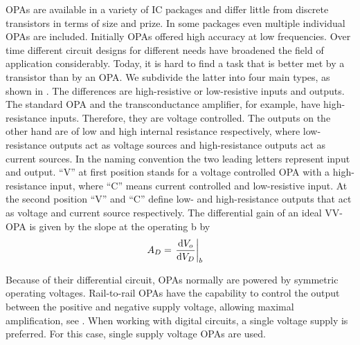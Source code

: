 \ac{OPA}s are available in a variety of \ac{IC} packages and differ little from discrete transistors in terms of size and prize. In some packages even multiple individual \ac{OPA}s are included. Initially \ac{OPA}s offered high accuracy at low frequencies. Over time different circuit designs for different needs have broadened the field of application considerably. Today, it is hard to find a task that is better met by a transistor than by an \ac{OPA}. We subdivide the latter into four main types, as shown in . The differences are high-resistive or low-resistive inputs and outputs. The standard \ac{OPA} and the transconductance amplifier, for example, have high-resistance inputs. Therefore, they are voltage controlled. The outputs on the other hand are of low and high internal resistance respectively, where low-resistance outputs act as voltage sources and high-resistance outputs act as current sources. In the naming convention the two leading letters represent input and output. ``V'' at first position stands for a voltage controlled \ac{OPA} with a high-resistance input, where ``C'' means current controlled and low-resistive input. At the second position ``V'' and ``C'' define low- and high-resistance outputs that act as voltage and current source respectively.
The differential gain of an ideal VV-\ac{OPA} is given by the slope at the operating b by
\begin{align}
  A_D &= \eval{\dv{V_o}{V_D}}_{b}
\end{align}


Because of their differential circuit, \ac{OPA}s normally are powered by symmetric operating voltages. Rail-to-rail \ac{OPA}s have the capability to control the output between the positive and negative supply voltage, allowing maximal amplification, see .
When working with digital circuits, a single voltage supply is preferred. For this case, single supply voltage \ac{OPA}s are used.

